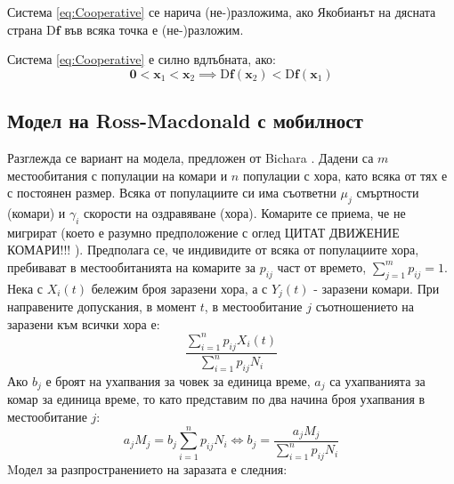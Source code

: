 \begin{definition}
  Система \eqref{eq:Cooperative} се нарича (не-)разложима, ако Якобианът на дясната страна $\mathrm{D}\mathbf{f}$ във всяка точка е (не-)разложим.
\end{definition}

\begin{definition}
  Система \eqref{eq:Cooperative} е силно вдлъбната, ако:
  \begin{equation*}
    \mathbf{0} < \mathbf{x}_1 < \mathbf{x}_2 \implies \mathrm{D}\mathbf{f}(\mathbf{x}_2) < \mathrm{D}\mathbf{f}(\mathbf{x}_1)
  \end{equation*}
\end{definition}

\subsection{Модел на Ross-Macdonald с мобилност}
Разглежда се вариант на модела, предложен от Bichara \cite{Bichara2016}. Дадени са $m$ местообитания с популации на комари и $n$ популации с хора, като всяка от тях е с постоянен размер. Всяка от популациите си има съответни $\mu_j$ смъртности (комари) и $\gamma_i$ скорости на оздравяване (хора). Комарите се приема, че не мигрират (което е разумно предположение с оглед \color{Red} ЦИТАТ ДВИЖЕНИЕ КОМАРИ!!!
\color{Black}). Предполага се, че индивидите от всяка от популациите хора, пребивават в местообитанията на комарите за $p_{ij}$ част от времето, $\sum_{j=1}^m p_{ij} = 1$. \\
Нека с $X_i(t)$ бележим броя заразени хора, а с $Y_j(t)$ - заразени комари. При направените допускания, в момент $t$, в местообитание $j$ съотношението на заразени към всички хора е:
\begin{equation}
  \frac{\sum_{i=1}^n p_{ij} X_i(t)}{\sum_{i=1}^n p_{ij} N_i}
\end{equation}
Ако $b_j$ е броят на ухапвания за човек за единица време, $a_j$ са ухапванията за комар за единица време, то като представим по два начина броя ухапвания в местообитание $j$:
\begin{equation}
  a_j M_j = b_j \sum_{i=1}^n p_{ij} N_i \iff b_j = \frac{a_j M_j}{\sum_{i=1}^n p_{ij} N_i}
\end{equation}
Mодел за разпространението на заразата е следния:
